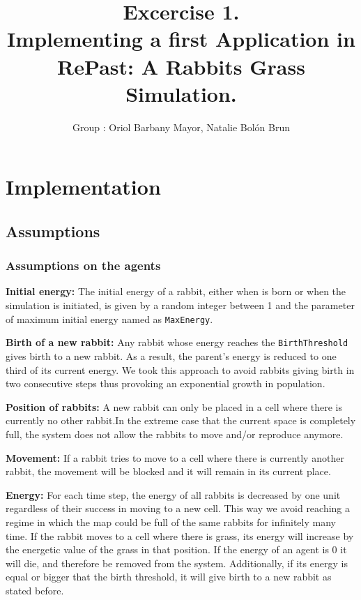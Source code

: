 \documentclass[11pt]{article}
\title{\bf Excercise 1.\\ Implementing a first Application in RePast: A Rabbits Grass Simulation.}
\author{Group \textnumero 54: Oriol Barbany Mayor, Natalie Bolón Brun}
\begin{document}
\maketitle

\section{Implementation}

\subsection{Assumptions}
\subsubsection{Assumptions on the \textbf{agents}}

\textbf{Initial energy: }The initial energy of a rabbit, either when is born or when the simulation is initiated, is given by a random integer between 1 and the parameter of maximum initial energy named as \texttt{MaxEnergy}.
    
\textbf{Birth of a new rabbit: } Any rabbit whose energy reaches the \texttt{BirthThreshold} gives birth to a new rabbit. As a result, the parent's energy is reduced to one third of its current energy. We took this approach to avoid rabbits giving birth in two consecutive steps thus provoking an exponential growth in population.

\textbf{Position of rabbits: } A new rabbit can only be placed in a cell where there is currently no other rabbit.In the extreme case that the current space is completely full, the system does not allow the rabbits to move and/or reproduce anymore.
    
\textbf{Movement: } If a rabbit tries to move to a cell where there is currently another rabbit, the movement will be blocked and it will remain in its current place. 
    
\textbf{Energy: } For each time step, the energy of all rabbits is decreased by one unit regardless of their success in moving to a new cell. This way we avoid reaching a regime in which the map could be full of the same rabbits for infinitely many time. If the rabbit moves to a cell where there is grass, its energy will increase by the energetic value of the grass in that position. If the energy of an agent is 0 it will die, and therefore be removed from the system. Additionally, if its energy is equal or bigger that the birth threshold, it will give birth to a new rabbit as stated before.
\end{document}
